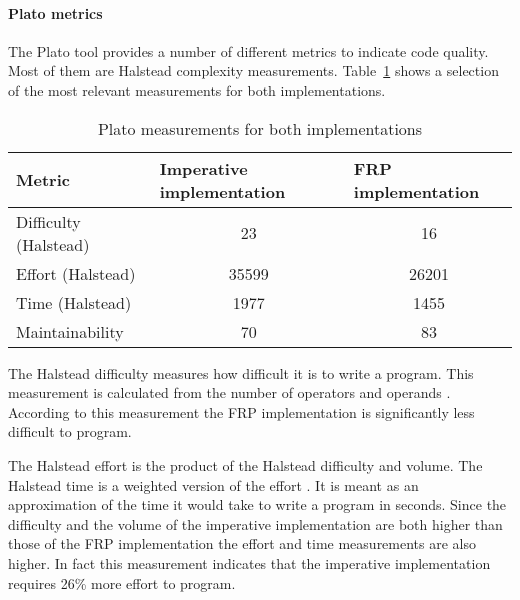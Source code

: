 \paragraph{Plato metrics}\mbox{}

The Plato tool provides a number of different metrics to indicate code quality. Most of them are Halstead complexity measurements. Table~\ref{table:plato} shows a selection of the most relevant measurements for both implementations.

\begin{table}[H]
	\centering
	\begin{tabular}{|l|c|c|}
		\hline
		\textbf{Metric}  & \multicolumn{1}{l|}{\textbf{Imperative implementation}} & \multicolumn{1}{l|}{\textbf{FRP implementation}} \\ \hline
		Difficulty (Halstead) & 23                                                      & 16                                               \\ \hline
		Effort (Halstead) & 35599                                                      & 26201                                               \\ \hline
		Time (Halstead)       & 1977                                                    & 1455                                             \\ \hline
		Maintainability       & 70                                                      & 83                                               \\ \hline
	\end{tabular}
	\caption{Plato measurements for both implementations}
	\label{table:plato}
\end{table}

The Halstead difficulty measures how difficult it is to write a program. This measurement is calculated from the number of operators and operands \cite{ibm-halstead}. According to this measurement the FRP implementation is significantly less difficult to program.

The Halstead effort is the product of the Halstead difficulty and volume. The Halstead time is a weighted version of the effort \cite{zuse-halstead}. It is meant as an approximation of the time it would take to write a program in seconds. Since the difficulty and the volume of the imperative implementation are both higher than those of the FRP implementation the effort and time measurements are also higher. In fact this measurement indicates that the imperative implementation requires 26\% more effort to program. 

